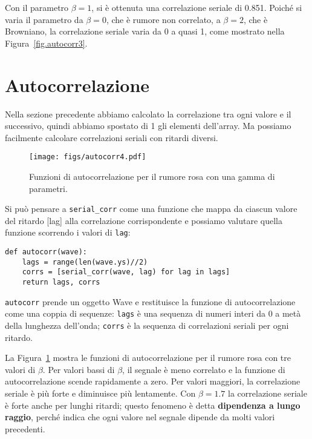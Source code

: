 \documentclass[12pt,a4paper]{book}
\begin{document}
Con il parametro $\beta=1$, si è ottenuta una correlazione seriale di 0.851. Poiché si varia il parametro da $\beta=0$, che è rumore non correlato, a $\beta=2$, che è Browniano, la correlazione seriale varia da 0 a quasi 1, come mostrato nella Figura~\ref{fig.autocorr3}.

\section{Autocorrelazione} \label{autopink} 

Nella sezione precedente abbiamo calcolato la correlazione tra ogni valore e il successivo, quindi abbiamo spostato di 1 gli elementi dell'array. Ma possiamo facilmente calcolare correlazioni seriali con ritardi diversi.

\begin{figure} 

\centerline{\texttt{[image: figs/autocorr4.pdf]}} \caption{Funzioni di autocorrelazione per il rumore rosa con una gamma di parametri.} \label{fig.autocorr4} \end{figure} 

Si può pensare a \verb"serial_corr" come una funzione che mappa da ciascun valore del ritardo [lag] alla correlazione corrispondente e possiamo valutare quella funzione scorrendo i valori di {\tt lag}:

\begin{verbatim} 
def autocorr(wave):
    lags = range(len(wave.ys)//2)
    corrs = [serial_corr(wave, lag) for lag in lags]
    return lags, corrs
 \end{verbatim} 

{\tt autocorr} prende un oggetto Wave e restituisce la funzione di autocorrelazione come una coppia di sequenze: {\tt lags} è una sequenza di numeri interi da 0 a metà della lunghezza dell'onda; {\tt corrs} è la sequenza di correlazioni seriali per ogni ritardo.

La Figura~\ref{fig.autocorr4} mostra le funzioni di autocorrelazione per il rumore rosa con tre valori di $\beta$. Per valori bassi di $\beta$, il segnale è meno correlato e la funzione di autocorrelazione scende rapidamente a zero. Per valori maggiori, la correlazione seriale è più forte e diminuisce più lentamente. Con $\beta=1.7$ la correlazione seriale è forte anche per lunghi ritardi; questo fenomeno è detta {\bf dipendenza a lungo raggio}, perché indica che ogni valore nel segnale dipende da molti valori precedenti.
\end{document}
